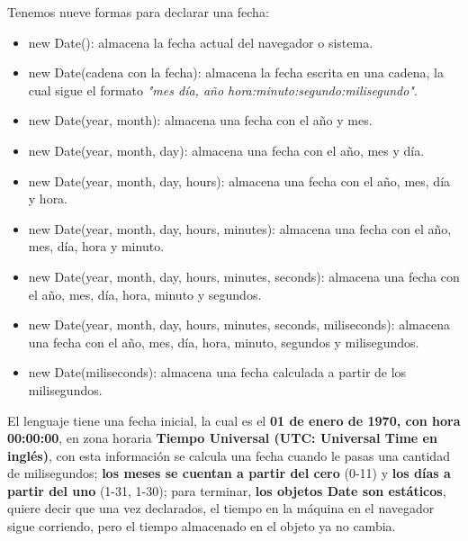 Tenemos nueve formas para declarar una fecha:
\begin{itemize}
    \item new Date(): almacena la fecha actual del navegador o sistema.
    \item new Date(cadena con la fecha): almacena la fecha escrita en una cadena, la cual sigue el formato \textit{"mes día, año hora:minuto:segundo:milisegundo"}.
    \item new Date(year, month): almacena una fecha con el año y mes.
    \item new Date(year, month, day): almacena una fecha con el año, mes y día.
    \item new Date(year, month, day, hours): almacena una fecha con el año, mes, día y hora.
    \item new Date(year, month, day, hours, minutes): almacena una fecha con el año, mes, día, hora y minuto.
    \item new Date(year, month, day, hours, minutes, seconds): almacena una fecha con el año, mes, día, hora, minuto y segundos.
    \item new Date(year, month, day, hours, minutes, seconds, miliseconds): almacena una fecha con el año, mes, día, hora, minuto, segundos y milisegundos.
    \item new Date(miliseconds): almacena una fecha calculada a partir de los milisegundos.
\end{itemize}

El lenguaje tiene una fecha inicial, la cual es el \textbf{01 de enero de 1970, con hora 00:00:00}, en zona horaria \textbf{Tiempo Universal (UTC: Universal Time en inglés)}, con esta información se calcula una fecha cuando le pasas una cantidad de milisegundos; \textbf{los meses se cuentan a partir del cero} (0-11) y \textbf{los días a partir del uno} (1-31, 1-30); para terminar, \textbf{los objetos Date son estáticos}, quiere decir que una vez declarados, el tiempo en la máquina en el navegador sigue corriendo, pero el tiempo almacenado en el objeto ya no cambia.


